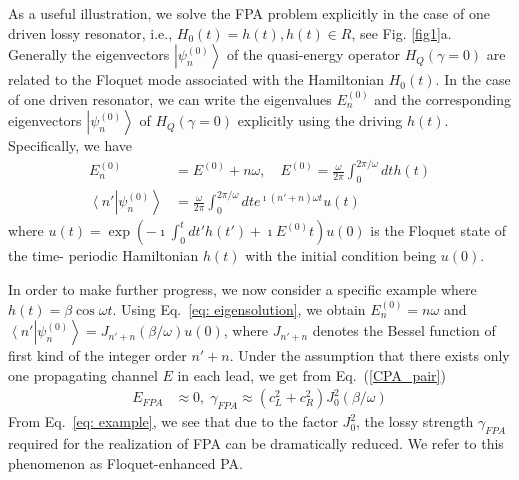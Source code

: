 \documentclass[aps,prl,twocolumn,showpacs,groupedaddress,amsmath,amssymb]{revtex4}
\begin{document}
As a useful illustration, we solve the FPA problem explicitly in the case of one driven lossy resonator, i.e., $H_{0}\left(t\right)=h\left(t\right),
h\left(t\right)\in R$, see Fig. \ref{fig1}a. Generally the eigenvectors $\left|\psi_{n}^{\left(0\right)}\right\rangle$ of the quasi-energy operator 
$H_{Q}\left(\gamma=0\right)$ are related to the Floquet mode associated with the Hamiltonian $H_{0}\left(t\right)$. In the case of one 
driven resonator, we can write the eigenvalues $E_{n}^{\left(0\right)}$ and the corresponding eigenvectors $\left|\psi_{n}^{\left(0\right)}
\right\rangle$ of $H_{Q}\left(\gamma=0\right)$ explicitly using the driving $h\left(t\right)$. Specifically, we have 
\begin{align}
E_{n}^{\left(0\right)} & =E^{\left(0\right)}+n\omega,\quad E^{\left(0\right)}=\frac{\omega}{2\pi}\int_{0}^{2\pi/\omega}dth\left(t\right)\nonumber \\
\left\langle n'\right.\left|\psi_{n}^{\left(0\right)}\right\rangle  & =\frac{\omega}{2\pi}\int_{0}^{2\pi/\omega}dte^{\imath\left(n'+n\right)\omega t}u
\left(t\right)
\label{eq: eigensolution}
\end{align}
where $u\left(t\right)=\exp\left(-\imath\int_{0}^{t}dt'h\left(t'\right)+\imath E^{\left(0\right)}t\right)u\left(0\right)$ is the Floquet state of the time-
periodic Hamiltonian $h\left(t\right)$ with the initial condition being $u\left(0\right)$.

In order to make further progress, we now consider a specific example where $h\left(t\right)=\beta\cos\omega t$. Using Eq.~\eqref{eq: eigensolution}, 
we obtain $E_{n}^{\left(0\right)}=n\omega$ and $\left\langle n'\right.\left|\psi_{n}^{\left(0\right)}\right\rangle =J_{n'+n}\left(\beta/\omega\right)u
\left(0\right)$, where $J_{n'+n}$ denotes the Bessel function of first kind of the integer order $n'+n$. Under the assumption that there exists 
only one propagating channel $E$ in each lead, we get from Eq.~(\ref{CPA_pair})
\begin{align}
E_{FPA} & \approx0,\;\gamma_{FPA}\approx\left(c_{L}^{2}+c_{R}^{2}\right)J_{0}^{2}\left(\beta/\omega\right)\label{eq: example}
\end{align}
From Eq.~\eqref{eq: example}, we see that due to the factor $J_0^2$, the lossy strength $\gamma_{FPA}$ required for the realization 
of FPA can be dramatically reduced. We refer to this phenomenon as Floquet-enhanced PA. 
\end{document}
